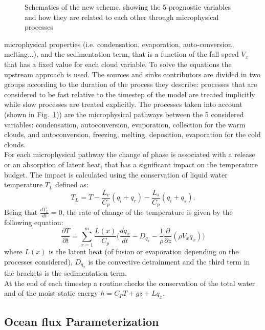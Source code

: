 {\begin{figure} [htpb!]
\begin{center}
\end{center}
\caption{\small Schematics of the new scheme, showing the 5 prognostic variables and  how they are related to each other through microphysical processes}
\label{fig:newscheme}
\end{figure}
\noindent microphysical properties (i.e. condensation, evaporation, auto-conversion, melting...), and the sedimentation term, that is a function of the fall speed $V_x$ that has a fixed value for each cloud variable. 
To solve the equations the upstream approach is used.  The sources and sinks contributors are divided in two groups according to the duration of the process they describe: processes that are considered to be fast relative to the timestep of the model are treated implicitly while slow processes are treated explicitly. The processes taken into account (shown in Fig.~\ref{fig:newscheme})) are the microphysical pathways between the 5 considered variables: condensation, autoconversion, evaporation, collection for the warm clouds, and autoconversion, freezing, melting, deposition, evaporation for the cold clouds.\\
For each microphysical pathway the change of phase is associated with a release or an absorption of latent heat, that has a significant impact on the temperature budget.
The impact is calculated using the conservation of liquid water temperature $T_L$ defined as:
\begin{equation}
T_L=T-\frac{L_v}{C_p}(q_l+q_r)-\frac{L_s}{C_p}(q_i+q_s).
\end{equation}
Being that $\frac{dT_L}{dt}=0$, the rate of change of the temperature is  given by the following equation:
\begin{equation}
\frac{\partial T}{\partial t}=\sum_{x=1}^m\frac{L(x)}{C_p}\Big(\frac{dq_x}{dt}-D_{q_x}-\frac{1}{\rho}\frac{\partial}{\partial z}(\rho V_x q_x)\Big)
\end{equation}
where $L(x)$ is the latent heat (of fusion or evaporation depending on the processes considered), $D_{q_x}$ is the convective detrainment and the third term in the brackets is the sedimentation term.\\
At the end of each timestep a routine checks the conservation of the total water and of the moist static energy $h=C_P T+gz+ Lq_x$.

\subsection{Ocean flux Parameterization}

}
